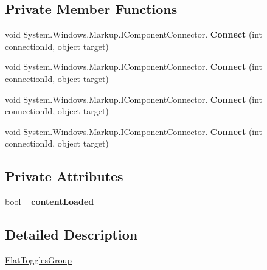 \subsection*{Private Member Functions}
\begin{DoxyCompactItemize}
\item 
\mbox{\label{class_wpf_handler_1_1_u_i_1_1_controls_1_1_flat_toggles_group_ac714bc342f0c8121d2adb1585696110c}} 
void System.\+Windows.\+Markup.\+I\+Component\+Connector. {\bfseries Connect} (int connection\+Id, object target)
\item 
\mbox{\label{class_wpf_handler_1_1_u_i_1_1_controls_1_1_flat_toggles_group_ac714bc342f0c8121d2adb1585696110c}} 
void System.\+Windows.\+Markup.\+I\+Component\+Connector. {\bfseries Connect} (int connection\+Id, object target)
\item 
\mbox{\label{class_wpf_handler_1_1_u_i_1_1_controls_1_1_flat_toggles_group_ac714bc342f0c8121d2adb1585696110c}} 
void System.\+Windows.\+Markup.\+I\+Component\+Connector. {\bfseries Connect} (int connection\+Id, object target)
\item 
\mbox{\label{class_wpf_handler_1_1_u_i_1_1_controls_1_1_flat_toggles_group_ac714bc342f0c8121d2adb1585696110c}} 
void System.\+Windows.\+Markup.\+I\+Component\+Connector. {\bfseries Connect} (int connection\+Id, object target)
\end{DoxyCompactItemize}
\subsection*{Private Attributes}
\begin{DoxyCompactItemize}
\item 
\mbox{\label{class_wpf_handler_1_1_u_i_1_1_controls_1_1_flat_toggles_group_a07a25f02db300f347d12a32175acc88b}} 
bool {\bfseries \+\_\+content\+Loaded}
\end{DoxyCompactItemize}


\subsection{Detailed Description}
\mbox{\hyperlink{class_wpf_handler_1_1_u_i_1_1_controls_1_1_flat_toggles_group}{Flat\+Toggles\+Group}} 

